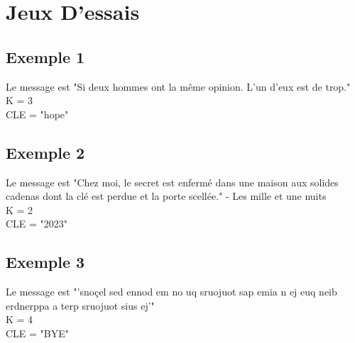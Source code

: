 \documentclass{article}
\begin{document}
\section{Jeux D'essais}
\subsection{Exemple 1}
Le message est "Si deux hommes ont la même opinion. L’un d’eux est de trop." \\
K = 3 \\
CLE = "hope" \\
\subsection{Exemple 2}
Le message est "Chez moi, le secret est enfermé dans une maison aux solides cadenas dont la clé est perdue et la porte scellée." - Les mille et une nuits \\
K = 2 \\
CLE = "2023" \\
\subsection{Exemple 3}
Le message est "'snoçel sed ennod em no uq sruojuot sap emia n ej euq neib erdnerppa a terp sruojuot sius ej'" \\
K = 4 \\
CLE = "BYE" \\
\end{document}
